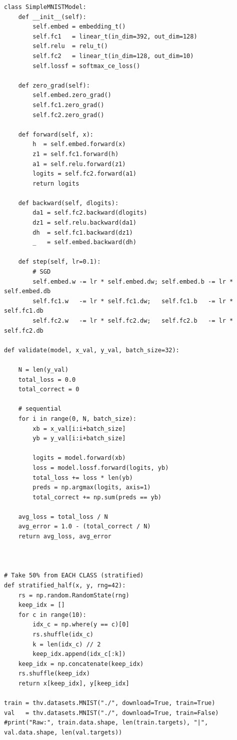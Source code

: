 \documentclass[11pt, reqno, letterpaper, twoside]{amsart}
\theoremstyle{plain}
\theoremstyle{definition}
\begin{document}
\begin{lstlisting}
class SimpleMNISTModel:
    def __init__(self):
        self.embed = embedding_t()
        self.fc1   = linear_t(in_dim=392, out_dim=128) 
        self.relu  = relu_t()
        self.fc2   = linear_t(in_dim=128, out_dim=10)
        self.lossf = softmax_ce_loss()

    def zero_grad(self):
        self.embed.zero_grad()
        self.fc1.zero_grad()
        self.fc2.zero_grad()

    def forward(self, x):             
        h  = self.embed.forward(x)    
        z1 = self.fc1.forward(h)      
        a1 = self.relu.forward(z1)    
        logits = self.fc2.forward(a1) 
        return logits

    def backward(self, dlogits):
        da1 = self.fc2.backward(dlogits)   
        dz1 = self.relu.backward(da1)      
        dh  = self.fc1.backward(dz1)       
        _   = self.embed.backward(dh)      

    def step(self, lr=0.1):
        # SGD 
        self.embed.w -= lr * self.embed.dw; self.embed.b -= lr * self.embed.db
        self.fc1.w   -= lr * self.fc1.dw;   self.fc1.b   -= lr * self.fc1.db
        self.fc2.w   -= lr * self.fc2.dw;   self.fc2.b   -= lr * self.fc2.db

def validate(model, x_val, y_val, batch_size=32):
  
    N = len(y_val)
    total_loss = 0.0
    total_correct = 0

    # sequential
    for i in range(0, N, batch_size):
        xb = x_val[i:i+batch_size]
        yb = y_val[i:i+batch_size]

        logits = model.forward(xb)          
        loss = model.lossf.forward(logits, yb)
        total_loss += loss * len(yb)
        preds = np.argmax(logits, axis=1)
        total_correct += np.sum(preds == yb)

    avg_loss = total_loss / N
    avg_error = 1.0 - (total_correct / N)
    return avg_loss, avg_error



# Take 50% from EACH CLASS (stratified)
def stratified_half(x, y, rng=42):
    rs = np.random.RandomState(rng)
    keep_idx = []
    for c in range(10):  
        idx_c = np.where(y == c)[0]
        rs.shuffle(idx_c)
        k = len(idx_c) // 2  
        keep_idx.append(idx_c[:k])
    keep_idx = np.concatenate(keep_idx)
    rs.shuffle(keep_idx)
    return x[keep_idx], y[keep_idx]

train = thv.datasets.MNIST("./", download=True, train=True)
val   = thv.datasets.MNIST("./", download=True, train=False)
#print("Raw:", train.data.shape, len(train.targets), "|", val.data.shape, len(val.targets))


\end{lstlisting}
\end{document}

